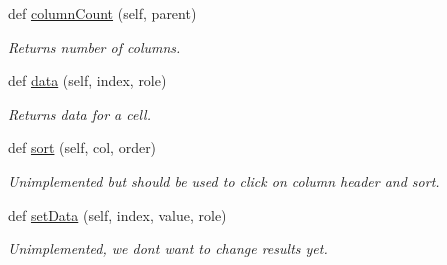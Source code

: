 \begin{DoxyCompactItemize}
def \mbox{\hyperlink{classgui_1_1sqlalchemy__model_1_1_sqlalchemy_model_a86d953656e0f8f5abe05f219e4e0a8e5}{column\+Count}} (self, parent)
\begin{DoxyCompactList}\small\item\em Returns number of columns. \end{DoxyCompactList}\item 
def \mbox{\hyperlink{classgui_1_1sqlalchemy__model_1_1_sqlalchemy_model_acac5f6d219495ecf08cd493d9f20e478}{data}} (self, index, role)
\begin{DoxyCompactList}\small\item\em Returns data for a cell. \end{DoxyCompactList}\item 
\mbox{\label{classgui_1_1sqlalchemy__model_1_1_sqlalchemy_model_a4d18079b72afcdfd1964c22cd57257d3}} 
def \mbox{\hyperlink{classgui_1_1sqlalchemy__model_1_1_sqlalchemy_model_a4d18079b72afcdfd1964c22cd57257d3}{sort}} (self, col, order)
\begin{DoxyCompactList}\small\item\em Unimplemented but should be used to click on column header and sort. \end{DoxyCompactList}\item 
\mbox{\label{classgui_1_1sqlalchemy__model_1_1_sqlalchemy_model_aa137b100b18489ef75246c9cb7ef17dc}} 
def \mbox{\hyperlink{classgui_1_1sqlalchemy__model_1_1_sqlalchemy_model_aa137b100b18489ef75246c9cb7ef17dc}{set\+Data}} (self, index, value, role)
\begin{DoxyCompactList}\small\item\em Unimplemented, we don\textquotesingle{}t want to change results yet. \end{DoxyCompactList}\end{DoxyCompactItemize}
